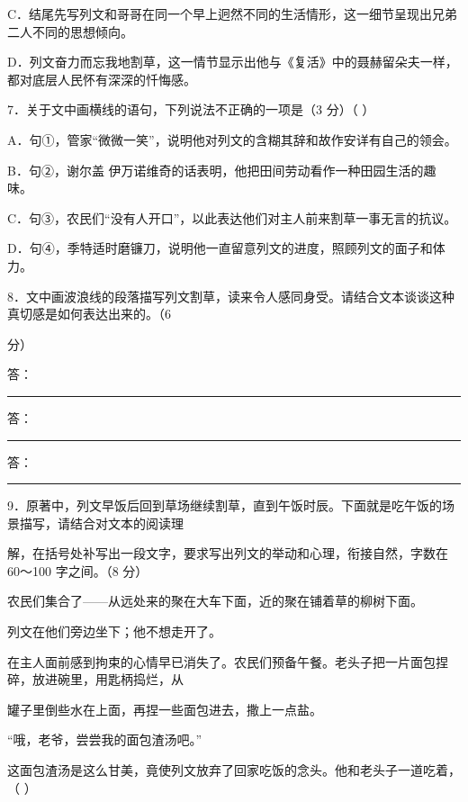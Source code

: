 \documentclass[UTF8,a4paper,fontset=fandol]{ctexart}
\begin{document}
C．结尾先写列文和哥哥在同一个早上迥然不同的生活情形，这一细节呈现出兄弟二人不同的思想倾向。\par
D．列文奋力而忘我地割草，这一情节显示出他与《复活》中的聂赫留朵夫一样，都对底层人民怀有深深的忏悔感。\par
\vspace{0.35em}\par
7．关于文中画横线的语句，下列说法不正确的一项是（3 分）（ ）\par
A．句①，管家“微微一笑”，说明他对列文的含糊其辞和故作安详有自己的领会。\par
B．句②，谢尔盖         伊万诺维奇的话表明，他把田间劳动看作一种田园生活的趣味。\par
C．句③，农民们“没有人开口”，以此表达他们对主人前来割草一事无言的抗议。\par
D．句④，季特适时磨镰刀，说明他一直留意列文的进度，照顾列文的面子和体力。\par
\vspace{0.35em}\par
8．文中画波浪线的段落描写列文割草，读来令人感同身受。请结合文本谈谈这种真切感是如何表达出来的。（6\par
分）\par
\noindent 答：\rule{0.88\linewidth}{0.35pt}\par
\noindent 答：\rule{0.88\linewidth}{0.35pt}\par
\noindent 答：\rule{0.88\linewidth}{0.35pt}\par
9．原著中，列文早饭后回到草场继续割草，直到午饭时辰。下面就是吃午饭的场景描写，请结合对文本的阅读理\par
解，在括号处补写出一段文字，要求写出列文的举动和心理，衔接自然，字数在 60～100 字之间。（8 分）\par
\hspace*{1.8em}农民们集合了——从远处来的聚在大车下面，近的聚在铺着草的柳树下面。\par
\clearpage
\hspace*{1.8em}列文在他们旁边坐下；他不想走开了。\par
\hspace*{1.8em}在主人面前感到拘束的心情早已消失了。农民们预备午餐。老头子把一片面包捏碎，放进碗里，用匙柄捣烂，从\par
罐子里倒些水在上面，再捏一些面包进去，撒上一点盐。\par
\hspace*{1.8em}“哦，老爷，尝尝我的面包渣汤吧。”\par
\hspace*{1.8em}这面包渣汤是这么甘美，竟使列文放弃了回家吃饭的念头。他和老头子一道吃着，（ ）\par
\end{document}
